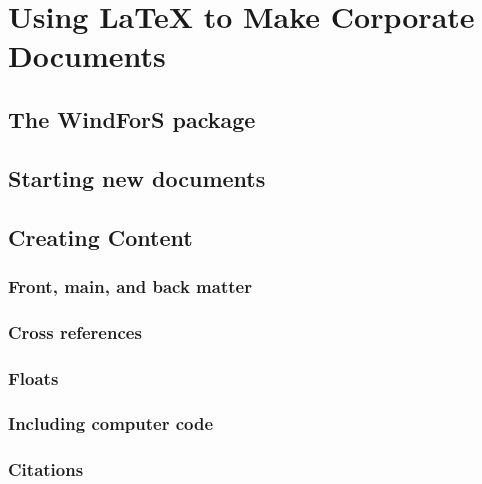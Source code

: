 \section{Using LaTeX to Make Corporate Documents }


\subsection{The WindForS package}\label{sec:Corporatecls}


\subsection{Starting new documents}\label{sec:NewDocs}


\subsection{Creating Content}
\subsubsection{Front, main, and back matter}


\subsubsection{Cross references}


\subsubsection{Floats}


\subsubsection{Including computer code}\label{Sec:Codes}


\subsubsection{Citations}\label{Sec:Citations}


